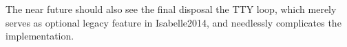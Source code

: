 \begin{isabellebody}
\begin{isamarkuptext}
\begin{itemize}
\end{itemize}

The near future should also see the final disposal the TTY loop, which
merely serves as optional legacy feature in Isabelle2014, and needlessly
complicates the implementation.\end{isamarkuptext}\isamarkuptrue \isadelimtheory
\endisadelimtheory
\isatagtheory
{}\isamarkupfalse \endisatagtheory
{\isafoldtheory}\isadelimtheory
\endisadelimtheory
\isanewline
\end{isabellebody}